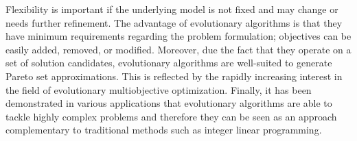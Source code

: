         Flexibility is important if the underlying model is not fixed and may change
        or needs further refinement. The advantage of evolutionary algorithms is that they have minimum requirements regarding the problem formulation; objectives can be easily added, removed, or modified. Moreover, due the fact that they operate on a set of solution candidates, evolutionary algorithms are well-suited to generate Pareto set approximations. This is reflected by the rapidly increasing interest in the field of evolutionary multiobjective optimization. Finally, it has been demonstrated in various applications that evolutionary algorithms are able to tackle highly complex problems and therefore they can be seen as an approach complementary to traditional methods such as integer linear programming.
